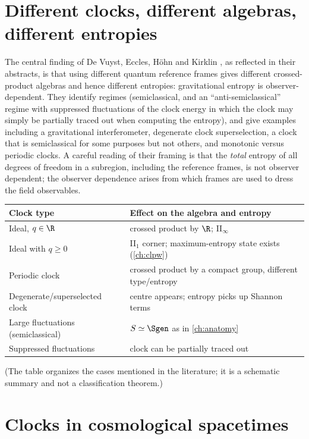 \section{Different clocks, different algebras, different entropies}

The central finding of De Vuyst, Eccles, H\"ohn and Kirklin \cite{DEHK2024a,DEHK2024b}, as reflected in their abstracts, is that using different quantum reference frames gives different crossed-product algebras and hence different entropies: gravitational entropy is observer-dependent. They identify regimes (semiclassical, and an ``anti-semiclassical'' regime with suppressed fluctuations of the clock energy in which the clock may simply be partially traced out when computing the entropy), and give examples including a gravitational interferometer, degenerate clock superselection, a clock that is semiclassical for some purposes but not others, and monotonic versus periodic clocks. A careful reading of their framing is that the \emph{total} entropy of all degrees of freedom in a subregion, including the reference frames, is not observer dependent; the observer dependence arises from which frames are used to dress the field observables.

\begin{center}
\renewcommand{\arraystretch}{1.3}
\begin{tabular}{@{}p{3.4cm}p{9cm}@{}}
\toprule
Clock type & Effect on the algebra and entropy\\
\midrule
Ideal, $q\in\R$ & crossed product by $\R$; II$_\infty$\\
Ideal with $q\ge0$ & II$_1$ corner; maximum-entropy state exists (\cref{ch:clpw})\\
Periodic clock & crossed product by a compact group, different type/entropy\\
Degenerate/superselected clock & centre appears; entropy picks up Shannon terms\\
Large fluctuations (semiclassical) & $S\simeq\Sgen$ as in \cref{ch:anatomy}\\
Suppressed fluctuations & clock can be partially traced out\\
\bottomrule
\end{tabular}
\end{center}
(The table organizes the cases mentioned in the literature; it is a schematic summary and not a classification theorem.)

\section{Clocks in cosmological spacetimes}

